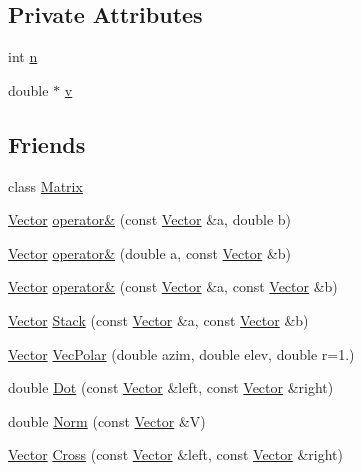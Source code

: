 \subsection*{Private Attributes}
\begin{DoxyCompactItemize}
\item 
int \hyperlink{classVector_ae98c07dd919f955878426f11a667cb17}{n}
\item 
double $\ast$ \hyperlink{classVector_a47bd493ed4108e07d835bee137edb26b}{v}
\end{DoxyCompactItemize}
\subsection*{Friends}
\begin{DoxyCompactItemize}
\item 
class \hyperlink{classVector_a34913a9261681f734171a6da06bd56fe}{Matrix}
\item 
\hyperlink{classVector}{Vector} \hyperlink{classVector_ad24714ba667b9b80973205bfc88987db}{operator\&} (const \hyperlink{classVector}{Vector} \&a, double b)
\item 
\hyperlink{classVector}{Vector} \hyperlink{classVector_a5c07a48a259a6fcb9080f99328b322af}{operator\&} (double a, const \hyperlink{classVector}{Vector} \&b)
\item 
\hyperlink{classVector}{Vector} \hyperlink{classVector_a5114d057e6d3221984827c86220b5aa2}{operator\&} (const \hyperlink{classVector}{Vector} \&a, const \hyperlink{classVector}{Vector} \&b)
\item 
\hyperlink{classVector}{Vector} \hyperlink{classVector_ad3352c6f838a6a97403bc6f2d6bda5df}{Stack} (const \hyperlink{classVector}{Vector} \&a, const \hyperlink{classVector}{Vector} \&b)
\item 
\hyperlink{classVector}{Vector} \hyperlink{classVector_a4237d770a0a392f36e148bc882701717}{Vec\-Polar} (double azim, double elev, double r=1.)
\item 
double \hyperlink{classVector_a71375a6ebee7fc40c1d45985175d82e5}{Dot} (const \hyperlink{classVector}{Vector} \&left, const \hyperlink{classVector}{Vector} \&right)
\item 
double \hyperlink{classVector_a313ce8c9730e0bd08a1396f364f0486c}{Norm} (const \hyperlink{classVector}{Vector} \&V)
\item 
\hyperlink{classVector}{Vector} \hyperlink{classVector_ab712f21cc19675f37e17e08bb51a82b4}{Cross} (const \hyperlink{classVector}{Vector} \&left, const \hyperlink{classVector}{Vector} \&right)

\end{DoxyCompactItemize}
